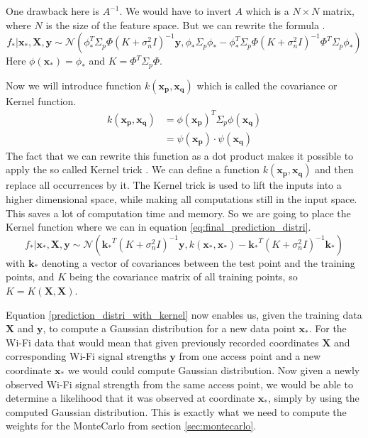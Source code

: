 One drawback here is $A^{-1}$. We would have to invert $A$ which is a $N\times N$ matrix, where $N$ is the size of the feature space. But we can rewrite the formula \citep[p.\ 12]{Rasmussen:2005:GPM:1162254}. 
\begin{equation}\label{eq:final_prediction_distri}
f_*|\mathbf{x_*},\mathbf{X}, \mathbf{y} \sim \mathcal{N}(\phi_*^T\Sigma_p\Phi(K+\sigma_n^2I)^{-1}\mathbf{y}, \phi_*\Sigma_p\phi_*-\phi_*^T\Sigma_p\Phi(K+\sigma_n^2I)^{-1}\Phi^T\Sigma_p\phi_*)
\end{equation}
Here $\phi(\mathbf{x_*}) = \phi_*$ and $K = \Phi^T\Sigma_p\Phi$.

Now we will introduce function $k(\mathbf{x_p}, \mathbf{x_q})$ which is called the covariance or \gls{Kernel} function. 
\begin{equation}\label{kernel}
\begin{aligned}
k(\mathbf{x_p}, \mathbf{x_q}) &= \phi(\mathbf{x_p})^T\Sigma_p\phi(\mathbf{x_q})\\
&= \psi(\mathbf{x_p}) \cdot \psi(\mathbf{x_q})
\end{aligned}
\end{equation}
The fact that we can rewrite this function as a dot product makes it possible to apply the so called \gls{Kernel} trick \citep[p.\ 12]{Rasmussen:2005:GPM:1162254}. We can define a function $k(\mathbf{x_p},\mathbf{x_q})$ and then replace all occurrences by it. The \gls{Kernel} trick is used to lift the inputs into a higher dimensional space, while making all computations still in the input space. This saves a lot of computation time and memory. So we are going to place the \gls{Kernel} function where we can in equation \ref{eq:final_prediction_distri}.
\begin{equation}\label{prediction_distri_with_kernel}
f_*|\mathbf{x_*},\mathbf{X}, \mathbf{y} \sim \mathcal{N}(\mathbf{k_*}^T(K+\sigma_n^2I)^{-1}\mathbf{y}, k(\mathbf{x_*},\mathbf{x_*})-\mathbf{k_*}^T(K+\sigma_n^2I)^{-1}\mathbf{k_*})
\end{equation}
with $\mathbf{k_*}$ denoting a vector of covariances between the test point and the training points, and $K$ being the covariance matrix of all training points, so $K = K(\mathbf{X}, \mathbf{X})$.

Equation \ref{prediction_distri_with_kernel} now enables us, given the training data $\mathbf{X}$ and $\mathbf{y}$, to compute a Gaussian distribution for a new data point $\mathbf{x_*}$. For the Wi-Fi data that would mean that given previously recorded coordinates $\mathbf{X}$ and corresponding Wi-Fi signal strengths $\mathbf{y}$ from one access point and a new coordinate $\mathbf{x_*}$ we would could compute Gaussian distribution. Now given a newly observed Wi-Fi signal strength from the same access point, we would be able to determine a likelihood that it was observed at coordinate $\mathbf{x_*}$, simply by using the computed Gaussian distribution. This is exactly what we need to compute the weights for the \Gls{MonteCarlo} from section \ref{sec:montecarlo}.

